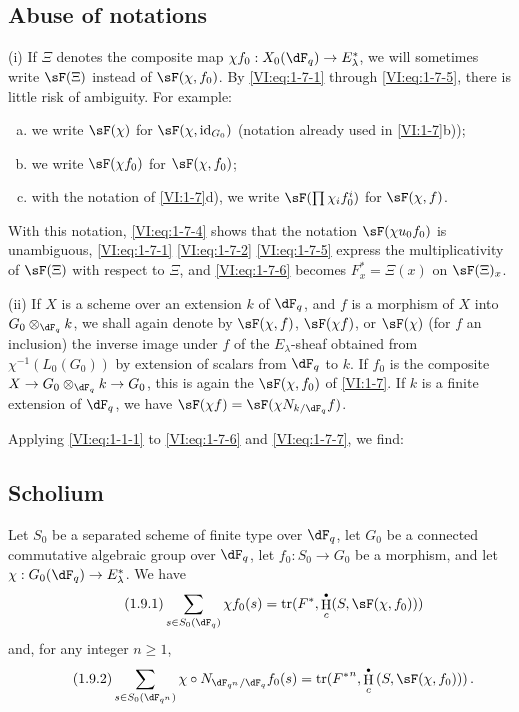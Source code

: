 \documentclass[oneside]{book}
\DeclareMathOperator{\h}{H}
\DeclareMathOperator{\tr}{tr}
\theoremstyle{sga-source}
\theoremstyle{sga-source-dash}
\theoremstyle{sga-source-dotdash}
\theoremstyle{sga-source-number-note-dash}
\theoremstyle{sga-source-note-number-dotdash}
\theoremstyle{sga-source-example-dotdash}
\theoremstyle{sga-source-inline-number}
\theoremstyle{sga-source-bare-number}
\theoremstyle{sga-source}
\let\oldbullet\bullet
\renewcommand{\bullet}{\textnormal{\tiny$\oldbullet$}}
\newcommand{\PrintPage}[1]{}\newcommand{\MathPage}[1]{}\newcommand{\PrintCite}[2]{#1}\newcommand{\var}[3]{#1}
\begin{document}
\subsection{Abuse of notations}\label{VI:1-8}

(i) If $\Xi$ denotes the composite map 
$\chi f_0:X_0(\dF_q) \to E_\lambda^\ast$, we will sometimes write $\sF(\Xi)$ 
instead of $\sF(\chi,f_0)$. By \eqref{VI:eq:1-7-1} through \eqref{VI:eq:1-7-5}, 
there is little risk of ambiguity. For example:
\begin{enumerate}[a)]
  \item we write $\sF(\chi)$ for $\sF(\chi,\operatorname{id}_{G_0})$ 
    (notation already used in \ref{VI:1-7}b)); 
  \item we write $\sF(\chi f_0)$ for $\sF(\chi,f_0)$;
  \item with the notation of \ref{VI:1-7}d), we write 
    $\sF(\prod \chi_i f_0^i)$ for $\var{\sF(\chi,f)}{\sF(\chi,f_0)}{S45-SOL-0690}$. 
\end{enumerate}

\PrintPage{174}
With this notation, \eqref{VI:eq:1-7-4} shows that the notation 
$\sF(\chi u_0 f_0)$ is unambiguous, \eqref{VI:eq:1-7-1} \eqref{VI:eq:1-7-2} 
\eqref{VI:eq:1-7-5} express the multiplicativity of $\sF(\Xi)$ with respect to $\Xi$, 
and \eqref{VI:eq:1-7-6} becomes $F_x^\ast = \Xi(x)$ on $\sF(\Xi)_x$.

(ii) If $X$ is a scheme over an extension $k$ of $\dF_q$, and $f$ is a 
morphism of $X$ into $G_0\otimes_{\dF_q} k$, we shall again denote by $\sF(\chi,f)$, 
$\sF(\chi f)$, or $\sF(\chi)$ (for $f$ an inclusion) the inverse image under 
$f$ of the $E_\lambda$-sheaf obtained from $\chi^{-1}(L_0(G_0))$ by extension of 
scalars from $\dF_q$ to $k$. If $f_0$ is the composite 
$X\to G_0\otimes_{\dF_q} k \to G_0$, this is again the $\sF(\chi,f_0)$ of 
\ref{VI:1-7}. If $k$ is a finite extension of $\dF_q$, we have 
$\sF(\chi f) = \sF(\chi N_{k/\dF_q} f)$. 

Applying \eqref{VI:eq:1-1-1} to \eqref{VI:eq:1-7-6} and \eqref{VI:eq:1-7-7}, 
we find: 





\subsection{Scholium}\label{VI:1-9}
Let $S_0$ be a separated scheme of finite type over $\dF_q$, let $G_0$ be a 
connected commutative algebraic group over $\dF_q$, let $f_0:S_0\to G_0$ be a morphism, and let 
$\chi:G_0(\dF_q) \to E_\lambda^\ast$. We have 
\begin{equation*}\tag{1.9.1}\label{VI:eq:1-9-1}
  \sum_{s\in S_0(\dF_q)} \chi f_0(s) = \tr(F^\ast,\h_c^\bullet(S,\sF(\chi,f_0))) 
\end{equation*}
and, for any integer $n\geqslant 1$,
\begin{equation*}\tag{1.9.2}\label{VI:eq:1-9-2}
  \sum_{s\in S_0(\dF_{q^n})} \chi\circ N_{\dF_{q^n}/\dF_q} f_0(s) = \tr({F^\ast}^n, \h_c^\bullet\left(S,\sF(\chi,f_0))\right) \text{.}
\end{equation*}
\end{document}
